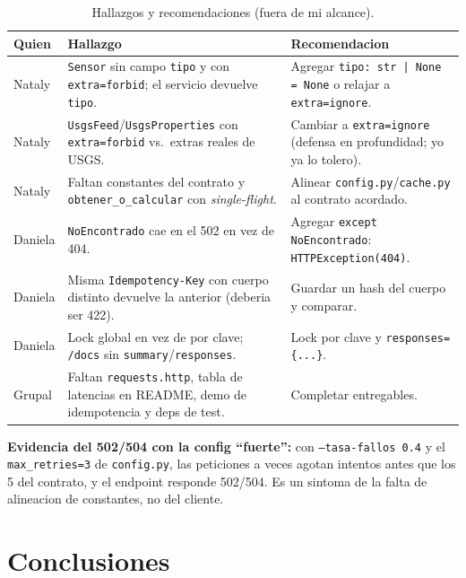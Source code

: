 \documentclass[11pt,a4paper]{article}
\newcommand{\arch}[1]{\texttt{#1}}
\newcommand{\quot}{\textquotedbl}
\begin{document}
\begin{table}[H]
\centering
\small
\begin{tabular}{p{2.4cm} p{5.4cm} p{6.4cm}}
\toprule
\textbf{Quien} & \textbf{Hallazgo} & \textbf{Recomendacion} \\
\midrule
Nataly & \arch{Sensor} sin campo \arch{tipo} y con \arch{extra=\quot forbid\quot};
el servicio devuelve \arch{tipo}. & Agregar \arch{tipo: str | None = None} o
relajar a \arch{extra=\quot ignore\quot}. \\
Nataly & \arch{UsgsFeed}/\arch{UsgsProperties} con \arch{extra=\quot forbid\quot}
vs.\ extras reales de USGS. & Cambiar a \arch{extra=\quot ignore\quot} (defensa en
profundidad; yo ya lo tolero). \\
Nataly & Faltan constantes del contrato y \arch{obtener\_o\_calcular} con
\emph{single-flight}. & Alinear \arch{config.py}/\arch{cache.py} al
contrato acordado. \\
Daniela & \arch{NoEncontrado} cae en el 502 en vez de 404. & Agregar
\arch{except NoEncontrado}: \arch{HTTPException(404)}. \\
Daniela & Misma \arch{Idempotency-Key} con cuerpo distinto devuelve la
anterior (deberia ser 422). & Guardar un hash del cuerpo y comparar. \\
Daniela & Lock global en vez de por clave; \arch{/docs} sin
\arch{summary}/\arch{responses}. & Lock por clave y \arch{responses=\{...\}}. \\
Grupal & Faltan \arch{requests.http}, tabla de latencias en README, demo de
idempotencia y deps de test. & Completar entregables. \\
\bottomrule
\end{tabular}
\caption{Hallazgos y recomendaciones (fuera de mi alcance).}
\end{table}

\textbf{Evidencia del 502/504 con la config ``fuerte'':} con
\arch{--tasa-fallos 0.4} y el \arch{max\_retries=3} de \arch{config.py}, las
peticiones a veces agotan intentos antes que los 5 del contrato, y el
endpoint responde 502/504. Es un sintoma de la falta de alineacion de
constantes, no del cliente.

\section{Conclusiones}
\end{document}
